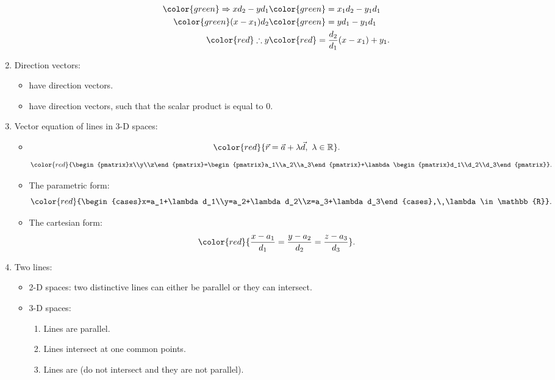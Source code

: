 \documentclass[12pt, a4paper]{article}
\def\d{{\mathrm{d}}}
\begin{document}
\begin{enumerate}
\begin{itemize}
$$\begin{aligned}
      \color{green} \Rightarrow xd_2-yd_1&\color{green}=x_1d_2-y_1d_1\\
      \color{green}(x-x_1)d_2&\color{green}=yd_1-y_1d_1\\
      \color{red}\therefore y&\color{red}=\frac{d_2}{d_1}(x-x_1)+y_1.
    \end{aligned}$$
  \end{itemize}
  \item Direction vectors: 
  \begin{itemize}
    \item \textbf{\color{red}{Parallel lines}} have \textbf{\color{red}{collinear}} direction vectors. 
    \item \textbf{\color{red}{Perpendicular lines}} have \textbf{\color{red}{orthogonal}} direction vectors, such that the scalar product is equal to 0. 
  \end{itemize}
  \item Vector equation of lines in 3-D spaces: 
  \begin{itemize}
    \item $${\color{red}{\vec{r}=\vec{a}+\lambda\vec{d},\ \lambda\in\mathbb{R}}}.$$
    $${\color{red}{\begin{pmatrix}x\\y\\z\end{pmatrix}=\begin{pmatrix}a_1\\a_2\\a_3\end{pmatrix}+\lambda\begin{pmatrix}d_1\\d_2\\d_3\end{pmatrix}}}.$$
    \item The parametric form: 
    $${\color{red}{\begin{cases}x=a_1+\lambda d_1\\y=a_2+\lambda d_2\\z=a_3+\lambda d_3\end{cases},\ \lambda\in\mathbb{R}}}.$$
    \item The cartesian form: 
    $${\color{red}{\frac{x-a_1}{d_1}=\frac{y-a_2}{d_2}=\frac{z-a_3}{d_3}}}.$$
  \end{itemize}
  \item Two lines: 
  \begin{itemize}
    \item 2-D spaces: two distinctive lines can either be parallel or they can intersect. 
    \item 3-D spaces: 
    \begin{enumerate}
      \item Lines are parallel.
      \item Lines intersect at one common points.
      \item Lines are \textbf{\color{red}{skewed}} (do not intersect and they are not parallel).
    \end{enumerate}
  \end{itemize}
\end{enumerate}
\end{document}
